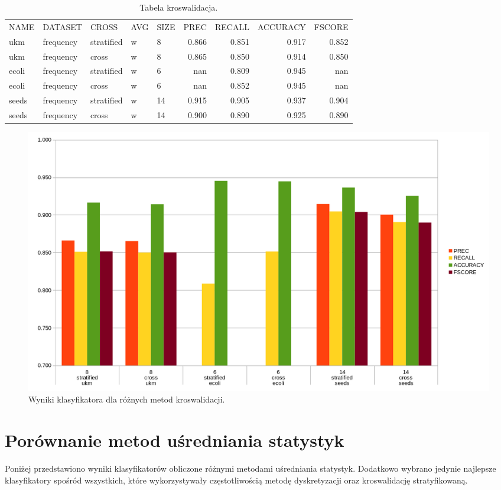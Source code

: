\begin{table}[H]
\centering
\caption{Tabela kroswalidacja.}
\label{table-cross}
\begin{tabular}{lllllrrrr}
NAME  & DATASET   & CROSS      & AVG & SIZE & PREC  & RECALL & ACCURACY & FSCORE \\
ukm   & frequency & stratified & w   & 8    & 0.866 & 0.851  & 0.917    & 0.852  \\
ukm   & frequency & cross      & w   & 8    & 0.865 & 0.850  & 0.914    & 0.850  \\
ecoli & frequency & stratified & w   & 6    & nan   & 0.809  & 0.945    & nan    \\
ecoli & frequency & cross      & w   & 6    & nan   & 0.852  & 0.945    & nan    \\
seeds & frequency & stratified & w   & 14   & 0.915 & 0.905  & 0.937    & 0.904  \\
seeds & frequency & cross      & w   & 14   & 0.900 & 0.890  & 0.925    & 0.890 
\end{tabular}
\end{table}
\begin{figure}[H]
	\centering
		\includegraphics[width=1.0\linewidth]{cross.png}
	\caption[Wyniki klasyfikatora dla różnych metod kroswalidacji.]{Wyniki klasyfikatora dla różnych metod kroswalidacji.}
	\label{fig:cross}
\end{figure}

\section{Porównanie metod uśredniania statystyk}

Poniżej przedstawiono wyniki klasyfikatorów obliczone różnymi metodami uśredniania statystyk. Dodatkowo wybrano jedynie najlepsze klasyfikatory spośród wszystkich, które wykorzystywały częstotliwością metodę dyskretyzacji oraz kroswalidację stratyfikowaną.

